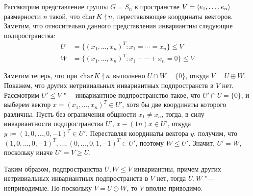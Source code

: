 \begin{example}
	Рассмотрим представление группы $G = S_n$ в пространстве $V = \langle e_1, \dotsc, e_n \rangle$ размерности $n$ такой, что $\operatorname{char}{K} \nmid n$, переставляющее координаты векторов. Заметим, что относительно данного представления инвариантны следующие подпространства:
	\begin{align*}
		U &= \{(x_1, \dotsc, x_n)^T : x_1 = \dotsb = x_n\} \le V
		\\
		W &= \{(x_1, \dotsc, x_n)^T : x_1 + \dotsb + x_n = 0\} \le V
	\end{align*}
	
	Заметим теперь, что при $\operatorname{char}{K} \nmid n$ выполнено $U \cap W = \{0\}$, откуда $V= U \oplus W$. Покажем, что других нетривиальных инвариантных подпространств в $V$ нет. Рассмотрим $U' \le V$ "--- инвариантное подпространство такое, что $U' \cap U = \{0\}$, и выберем вектор $x = (x_1, \dotsc, x_n)^T \in U'$, хотя бы две координаты которого различны. Пусть без ограничения общности $x_1 \ne x_n$, тогда, в силу инвариантности подпространства $U'$, $x - (1n)x \in U'$, откуда $y := (1, 0, \dotsc, 0, -1)^T \in U'$. Переставляя координаты вектора $y$, получим, что $(1, 0, \dotsc, 0, -1)^T, \dotsc, (0, \dotsc, 0, 1, -1)^T \in U'$, поэтому $W \le U'$. Значит, $U' = W$, поскольку иначе $U' = V \ge U$.
	
	Таким образом, подпространства $U, W \le V$ инвариантны, причем других нетривиальных инвариантных подпространств в $V$ нет, тогда $U, W$ "--- неприводимые. Но поскольку $V = U \oplus W$, то $V$ вполне приводимо.
\end{example}